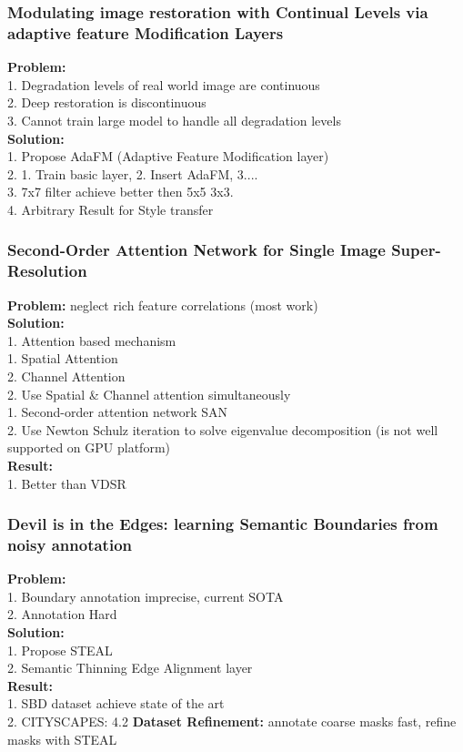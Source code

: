 \subsubsection{Modulating image restoration with Continual Levels via adaptive feature Modification Layers}
    {\bf Problem:} \\
        1. Degradation levels of real world image are continuous \\
        2. Deep restoration is discontinuous \\
        3. Cannot train large model to handle all degradation levels \\
    {\bf Solution:} \\
        1. Propose AdaFM (Adaptive Feature Modification layer) \\
        2. 1. Train basic layer, 2. Insert AdaFM, 3.... \\
        3. 7x7 filter achieve better then 5x5 3x3. \\
        4. Arbitrary Result for Style transfer \\
\subsubsection{Second-Order Attention Network for Single Image Super-Resolution}
    {\bf Problem:} neglect rich feature correlations (most work) \\
    {\bf Solution:} \\
        1. Attention based mechanism \\
            1. Spatial Attention \\
            2. Channel Attention \\
        2. Use Spatial \& Channel attention simultaneously \\
            1. Second-order attention network SAN \\
            2. Use Newton Schulz iteration to solve eigenvalue decomposition (is not well supported on GPU platform) \\
    {\bf Result:} \\
        1. Better than VDSR \\
\subsubsection{Devil is in the Edges: learning Semantic Boundaries from noisy annotation}
    {\bf Problem:} \\
        1. Boundary annotation imprecise, current SOTA \\
        2. Annotation Hard \\
    {\bf Solution:} \\
        1. Propose STEAL \\
        2. Semantic Thinning Edge Alignment layer \\
    {\bf Result:} \\
        1. SBD dataset achieve state of the art \\
        2. CITYSCAPES: 4.2%
    {\bf Dataset Refinement:} annotate coarse masks fast, refine masks with STEAL \\
